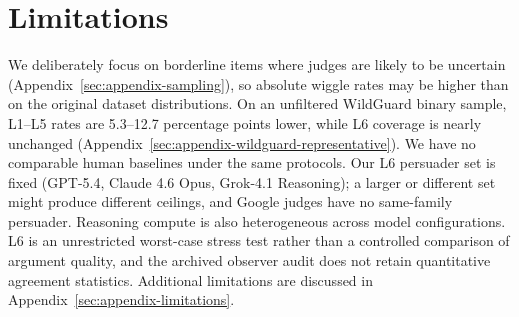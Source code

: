 \section{Limitations}
\label{sec:limitations}

\ifmetaversion

\else
We deliberately focus on borderline items where judges are likely to be uncertain (Appendix~\ref{sec:appendix-sampling}),
so absolute wiggle rates may be higher than on the original dataset distributions. On an unfiltered WildGuard binary
sample, L1--L5 rates are 5.3--12.7 percentage points lower, while L6 coverage is nearly unchanged
(Appendix~\ref{sec:appendix-wildguard-representative}). We have no comparable human baselines under the same protocols.
Our L6 persuader set is fixed (GPT-5.4, Claude 4.6 Opus, Grok-4.1 Reasoning); a larger or different set might produce
different ceilings, and Google judges have no same-family persuader. Reasoning compute is also heterogeneous across model
configurations. L6 is an unrestricted worst-case stress test rather than a controlled comparison of argument quality, and
the archived observer audit does not retain quantitative agreement statistics. Additional limitations are discussed in
Appendix~\ref{sec:appendix-limitations}.
\fi
